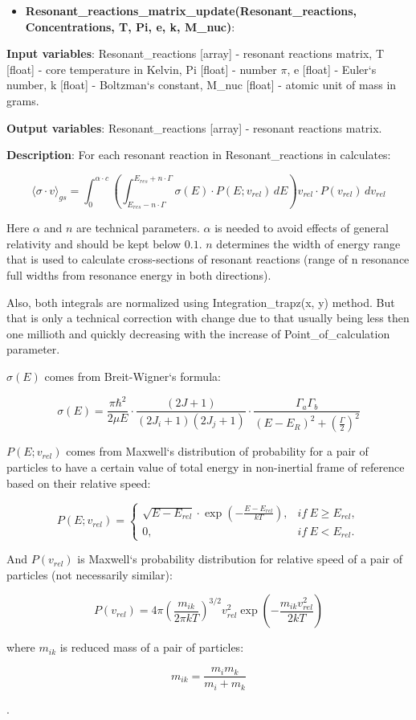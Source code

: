 \documentclass[a4paper,12pt]{article}
\newcommand{\namefunction}[4]{
  \begin{itemize}
    \item \textbf{#1}:
  \end{itemize}
  
  \textbf{Input variables}: #2.
  
  \textbf{Output variables}: #4.
  
  \textbf{Description}: #3.
}
\begin{document}
\namefunction{Resonant\_reactions\_matrix\_update(Resonant\_reactions, Concentrations, T, Pi, e, k, M\_nuc)}{Resonant\_reactions [array] - resonant reactions matrix, T [float] - core temperature in Kelvin, Pi [float] - number $\pi$, e [float] - Euler`s number, k [float] - Boltzman`s constant, M\_nuc [float] - atomic unit of mass in grams}{For each resonant reaction in Resonant\_reactions in calculates:

\[\langle \sigma \cdot v \rangle_{gs} = \int_{0}^{\alpha \cdot c} \left( \int_{E_{res} - n \cdot \Gamma}^{E_{res} + n \cdot \Gamma} \sigma(E) \cdot P(E; v_{rel}) \, dE \right) v_{rel} \cdot P(v_{rel}) \, dv_{rel}\]

Here $\alpha$ and $n$ are technical parameters. $\alpha$ is needed to avoid effects of general relativity and should be kept below $0.1$. $n$ determines the width of energy range that is used to calculate cross-sections of resonant reactions (range of n resonance full widths from resonance energy in both directions).

Also, both integrals are normalized using Integration\_trapz(x, y) method. But that is only a  technical correction with change due to that usually being less then one millioth and quickly decreasing with the increase of Point\_of\_calculation parameter.

$\sigma(E)$ comes from Breit-Wigner`s formula:

\[\sigma(E) = \frac{\pi \hbar^2}{2 \mu E} \cdot \frac{(2J + 1)}{(2J_{i} + 1)(2J_{j} + 1)} \cdot \frac{\Gamma_a \Gamma_b}{(E - E_R)^2 + \left( \frac{\Gamma}{2} \right)^2}\]

$P(E; v_{rel})$ comes from Maxwell`s distribution of probability for a pair of particles to have a certain value of total energy in non-inertial frame of reference based on their relative speed:

\[P(E; v_{rel}) = 
\left\{
\begin{array}{ll}
\sqrt{E - E_{rel}} \cdot \exp\left(-\frac{E - E_{rel}}{k T}\right), & if \ E \geq E_{rel}, \\
0, & if \ E < E_{rel}.
\end{array}
\right.\]

And $P(v_{rel})$ is Maxwell`s probability distribution for relative speed of a pair of particles (not necessarily similar):

\[P(v_{rel}) = 4 \pi \left( \frac{m_{ik}}{2 \pi k T} \right)^{3/2} v_{rel}^2 \exp \left( -\frac{m_{ik} v_{rel}^2}{2 k T} \right)\]

where $m_{ik}$ is reduced mass of a pair of particles:

\[m_{ik} = \frac{m_i m_k}{m_i + m_k}\]

}{Resonant\_reactions [array] - resonant reactions matrix}
\end{document}
